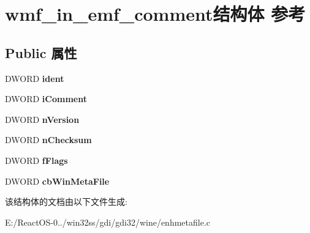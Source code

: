 \hypertarget{structwmf__in__emf__comment}{}\section{wmf\+\_\+in\+\_\+emf\+\_\+comment结构体 参考}
\label{structwmf__in__emf__comment}
\subsection*{Public 属性}
\begin{DoxyCompactItemize}
\item 
\mbox{\label{structwmf__in__emf__comment_a70c3e3486ae4e91a5c9ac0d9f51c4dca}} 
D\+W\+O\+RD {\bfseries ident}
\item 
\mbox{\label{structwmf__in__emf__comment_abc097474aca9ec17c8e91b34556c0dd9}} 
D\+W\+O\+RD {\bfseries i\+Comment}
\item 
\mbox{\label{structwmf__in__emf__comment_a61dfd40b54324c800576d83e14941314}} 
D\+W\+O\+RD {\bfseries n\+Version}
\item 
\mbox{\label{structwmf__in__emf__comment_ab957423e33d611345e87616a9b9e6190}} 
D\+W\+O\+RD {\bfseries n\+Checksum}
\item 
\mbox{\label{structwmf__in__emf__comment_afb0e25ec05df5997c90e2a4897518b0c}} 
D\+W\+O\+RD {\bfseries f\+Flags}
\item 
\mbox{\label{structwmf__in__emf__comment_aac366afbb34c3a7258c19ec27fd796e0}} 
D\+W\+O\+RD {\bfseries cb\+Win\+Meta\+File}
\end{DoxyCompactItemize}


该结构体的文档由以下文件生成\+:\begin{DoxyCompactItemize}
\item 
E\+:/\+React\+O\+S-\/0../win32ss/gdi/gdi32/wine/enhmetafile.\+c\end{DoxyCompactItemize}
